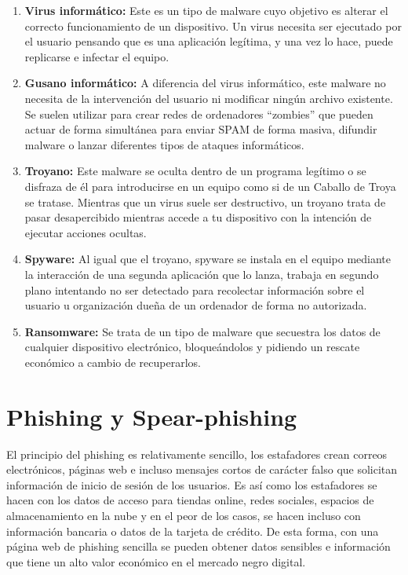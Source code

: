 \begin{enumerate}

\item {\bfseries Virus informático:}
Este es un tipo de malware cuyo objetivo es alterar el correcto funcionamiento de un dispositivo. Un virus necesita ser ejecutado por el usuario pensando que es una aplicación legítima, y una vez lo hace, puede replicarse e infectar el equipo.

\item {\bfseries Gusano informático:}
A diferencia del virus informático, este malware no necesita de la intervención del usuario ni modificar ningún archivo existente. Se suelen utilizar para crear redes de ordenadores “zombies” que pueden actuar de forma simultánea para enviar SPAM de forma masiva, difundir malware o lanzar diferentes tipos de ataques informáticos.

\item {\bfseries Troyano:}
Este malware se oculta dentro de un programa legítimo o se disfraza de él para introducirse en un equipo como si de un Caballo de Troya se tratase. Mientras que un virus suele ser destructivo, un troyano trata de pasar desapercibido mientras accede a tu dispositivo con la intención de ejecutar acciones ocultas.

\item {\bfseries Spyware:}
Al igual que el troyano, spyware se instala en el equipo mediante la interacción de una segunda aplicación que lo lanza, trabaja en segundo plano intentando no ser detectado para recolectar información sobre el usuario u organización dueña de un ordenador de forma no autorizada.

\item {\bfseries Ransomware:}
Se trata de un tipo de malware que secuestra los datos de cualquier dispositivo electrónico, bloqueándolos y pidiendo un rescate económico a cambio de recuperarlos. \cite{ransomware}



\end{enumerate}


\section{Phishing y Spear-phishing}
\label{sec:phishing-spear-phishing}

El principio del phishing es relativamente sencillo, los estafadores crean correos electrónicos, páginas web e incluso mensajes cortos de carácter falso 
que solicitan información de inicio de sesión de los usuarios. Es así como los estafadores se hacen con los datos de acceso para tiendas online, redes 
sociales, espacios de almacenamiento en la nube y en el peor de los casos, se hacen incluso con información bancaria o datos de la tarjeta de crédito. 
De esta forma, con una página web de phishing sencilla se pueden obtener datos sensibles e información que tiene un alto valor económico en el mercado 
negro digital.

